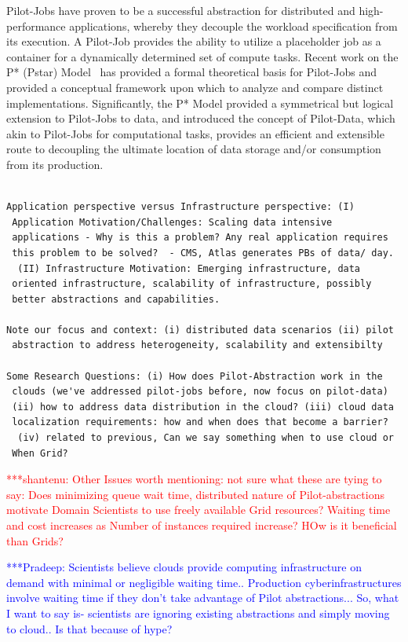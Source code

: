 \documentclass[times]{cpeauth}
\newcommand{\jhanote}[1]{ {\textcolor{red} { ***shantenu: #1 }}}
\newcommand{\pmnote}[1]{ {\textcolor{blue} { ***Pradeep: #1 }}}
\newcommand{\pmnote}[1]{}
\newcommand{\jhanote}[1]{}
\newcommand{\pilotjob}{Pilot-Job\xspace}
\newcommand{\pilotjobs}{Pilot-Jobs\xspace}
\begin{document}
\pilotjobs have proven to be a successful abstraction for distributed and
high-performance applications, whereby they decouple the workload
specification from its execution. A \pilotjob provides the ability to utilize
a placeholder job as a container for a dynamically determined set of compute
tasks. Recent work on the P* (Pstar) Model~\cite{pstar12} has provided a
formal theoretical basis for Pilot-Jobs and provided a conceptual framework
upon which to analyze and compare distinct implementations. Significantly, the
P* Model provided a symmetrical but logical extension to Pilot-Jobs to data,
and introduced the concept of Pilot-Data, which akin to Pilot-Jobs for
computational tasks, provides an efficient and extensible route to decoupling
the ultimate location of data storage and/or consumption from its production.


\begin{verbatim}

Application perspective versus Infrastructure perspective: (I)
 Application Motivation/Challenges: Scaling data intensive
 applications - Why is this a problem? Any real application requires
 this problem to be solved?  - CMS, Atlas generates PBs of data/ day.
  (II) Infrastructure Motivation: Emerging infrastructure, data
 oriented infrastructure, scalability of infrastructure, possibly
 better abstractions and capabilities.

Note our focus and context: (i) distributed data scenarios (ii) pilot
 abstraction to address heterogeneity, scalability and extensibilty

Some Research Questions: (i) How does Pilot-Abstraction work in the
 clouds (we've addressed pilot-jobs before, now focus on pilot-data)
 (ii) how to address data distribution in the cloud? (iii) cloud data
 localization requirements: how and when does that become a barrier?
  (iv) related to previous, Can we say something when to use cloud or
 When Grid?

\end{verbatim}

\jhanote{Other Issues worth mentioning: not sure what these are tying
 to say: Does minimizing queue wait time, distributed nature of
 Pilot-abstractions motivate Domain Scientists to use freely available
 Grid resources?  Waiting time and cost increases as Number of
 instances required increase?  HOw is it beneficial than Grids?}


\pmnote{ Scientists believe clouds provide computing infrastructure on demand with minimal or negligible waiting time..  Production cyberinfrastructures involve waiting time if they don't take advantage of Pilot abstractions...  So, what I want to say is- scientists are ignoring existing abstractions and simply moving to cloud.. Is that because of hype? }
\end{document}
